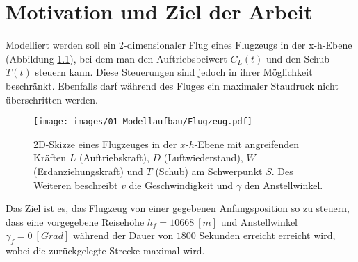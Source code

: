 \chapter{Motivation und Ziel der Arbeit}
Modelliert werden soll ein 2-dimensionaler Flug eines Flugzeugs in der x-h-Ebene (Abbildung \ref{img:Flugzeug}), bei dem man den Auftriebsbeiwert $C_L(t)$ und den Schub $T(t)$ steuern kann. Diese Steuerungen sind jedoch in ihrer Möglichkeit beschränkt. Ebenfalls darf während des Fluges ein maximaler Staudruck nicht überschritten werden.

\begin{figure}[H]
\begin{center}
\texttt{[image: images/01\_Modellaufbau/Flugzeug.pdf]}
\caption{2D-Skizze eines Flugzeuges in der $x$-$h$-Ebene mit angreifenden Kräften $L$ (Auftriebskraft), $D$ (Luftwiederstand), $W$ (Erdanziehungskraft) und $T$ (Schub) am Schwerpunkt $S$. Des Weiteren beschreibt $v$ die Geschwindigkeit und $\gamma$ den Anstellwinkel.}\label{img:Flugzeug}
\end{center}
\end{figure}

Das Ziel ist es, das Flugzeug von einer gegebenen Anfangsposition so zu steuern, dass eine vorgegebene Reisehöhe $h_f = 10668 \ [m]$ und Anstellwinkel $\gamma_f = 0 \ [Grad]$ während der Dauer von $1800$ Sekunden erreicht erreicht wird, wobei die zurückgelegte Strecke maximal wird.
